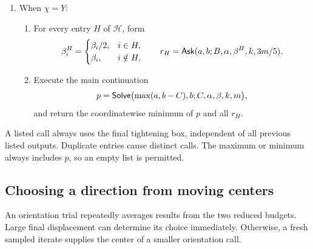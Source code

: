 \begin{procedure}
\begin{enumerate}[label=\textbf{S\arabic*.},ref=S\arabic*,leftmargin=*]
\item\label{alg:solve-y}
When $\chi=Y$:
\begin{enumerate}[label=(\alph*),leftmargin=*]
\item For every entry $H$ of $\mathcal H$, form
\[
 \beta_i^H=\begin{cases}\beta_i/2,&i\in H,\\\beta_i,&i\notin H,\end{cases}
 \qquad r_H=\mathsf{Ask}(a,b;B,\alpha,\beta^H,k,3m/5).
\]
\item Execute the main continuation
\[
 p=\mathsf{Solve}\bigl(\max(a,b-C),b;C,\alpha,\beta,k,m\bigr),
\]
and return the coordinatewise minimum of $p$ and all $r_H$.
\end{enumerate}
\end{enumerate}
\end{procedure}

A listed call always uses the final tightening box, independent of all
previous listed outputs. Duplicate entries cause distinct calls. The
maximum or minimum always includes $p$, so an empty list is permitted.

\subsection{Choosing a direction from moving centers}

An orientation trial repeatedly averages results from the two reduced
budgets. Large final displacement can determine its choice immediately.
Otherwise, a fresh sampled iterate supplies the center of a smaller
orientation call.

